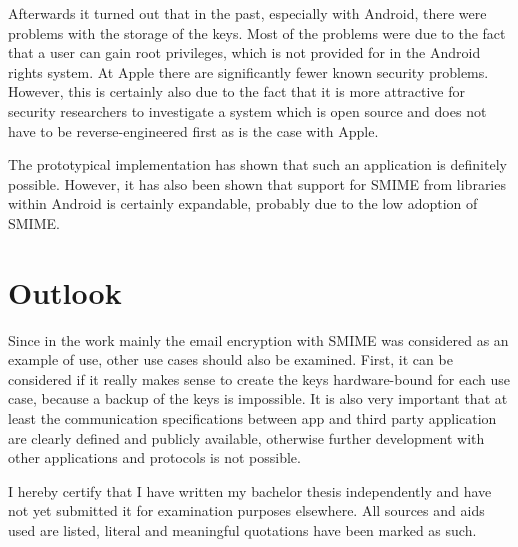 \documentclass[12pt,oneside,a4paper,parskip]{scrbook}
\begin{document}
Afterwards it turned out that in the past, especially with Android, there were problems with the storage of the keys. Most of the problems were due to the fact that a user can gain root privileges, which is not provided for in the Android rights system. At Apple there are significantly fewer known security problems. However, this is certainly also due to the fact that it is more attractive for security researchers to investigate a system which is open source and does not have to be reverse-engineered first as is the case with Apple.

The prototypical implementation has shown that such an application is definitely possible. However, it has also been shown that support for SMIME from libraries within Android is certainly expandable, probably due to the low adoption of SMIME. 
\section{Outlook}
Since in the work mainly the email encryption with SMIME was considered as an example of use, other use cases should also be examined. First, it can be considered if it really makes sense to create the keys hardware-bound for each use case, because a backup of the keys is impossible. It is also very important that at least the communication specifications between app and third party application are clearly defined and publicly available, otherwise further development with other applications and protocols is not possible.

\backmatter

\listoffigures
{}



\cleardoublepage
{}
{}
\printbibliography



I hereby certify that I have written my bachelor thesis independently and have not yet submitted it for examination purposes elsewhere. All sources and aids used are listed, literal and meaningful quotations have been marked as such.
\end{document}
